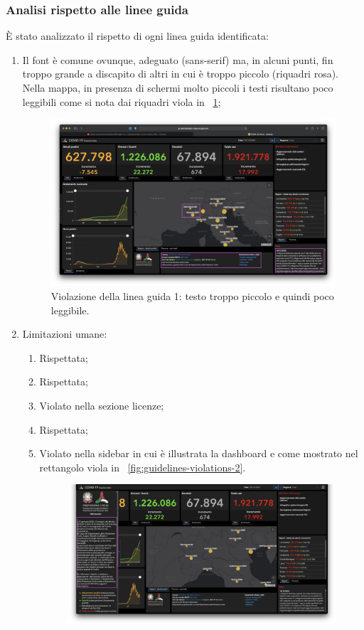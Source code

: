 \subsubsection{Analisi rispetto alle linee guida}
\label{sss:analisi-rispetto-linee-guida}
\`E stato analizzato il rispetto di ogni linea guida identificata:
\begin{enumerate}
    \item Il font è comune ovunque, adeguato (sans-serif) ma, in alcuni punti, fin troppo grande a discapito di altri in cui è troppo piccolo (riquadri rosa). Nella mappa, in presenza di schermi molto piccoli i testi risultano poco leggibili come si nota dai riquadri viola in ~\ref{fig:guidelines-violations-1};
        \begin{figure}[H]
        \centering
        \includegraphics[width=0.5\columnwidth]{../../../assets/images/verifica-risorse-esistenti/guidelines_violations_1}
        \caption{Violazione della linea guida 1: testo troppo piccolo e quindi poco leggibile.}
        \label{fig:guidelines-violations-1}
    \end{figure}
    \item Limitazioni umane:
        \begin{enumerate}[label=\alph*.]
                \item Rispettata;
                \item Rispettata;
                \item [\ref{lg:2.c}] Violato nella sezione licenze;
                \item [d.] Rispettata;
                \item [\ref{lg:2.e}] Violato nella sidebar in cui è illustrata la dashboard e come mostrato nel rettangolo viola in ~\ref{fig:guidelines-violations-2}.
                \begin{figure}[H]
                    \centering
                    \includegraphics[width=0.5\columnwidth]{../../../assets/images/verifica-risorse-esistenti/guidelines_violations_2}

\end{figure}
\end{enumerate}
\end{enumerate}
